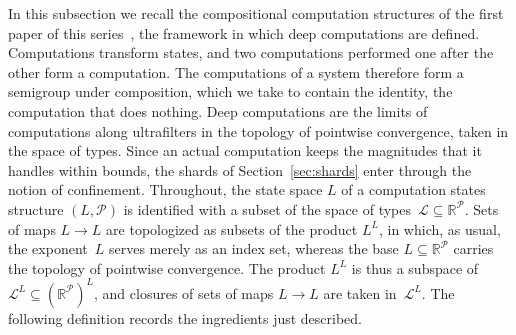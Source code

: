 \documentclass[psamsfonts]{amsart}
\theoremstyle{definition}
\theoremstyle{remark}
\numberwithin{equation}{section}
\begin{document}
In this subsection we recall the compositional computation structures of the first paper of this series~\cite{alva2024approximability}, the framework in which deep computations are defined.
Computations transform states, and two computations performed one after the other form a computation.
The computations of a system therefore form a semigroup under composition, which we take to contain the identity, the computation that does nothing.
Deep computations are the limits of computations along ultrafilters in the topology of pointwise convergence, taken in the space of types.
Since an actual computation keeps the magnitudes that it handles within bounds, the shards of Section~\ref{sec:shards} enter through the notion of confinement.
Throughout, the state space $L$ of a computation states structure $(L,\mathcal{P})$ is identified with a subset of the space of types~$\mathcal{L}\subseteq\mathbb{R}^{\mathcal{P}}$.
Sets of maps $L\to L$ are topologized as subsets of the product $L^L$, in which, as usual, the exponent~$L$ serves merely as an index set, whereas the base $L\subseteq\mathbb{R}^{\mathcal{P}}$ carries the topology of pointwise convergence.
The product $L^L$ is thus a subspace of~$\mathcal{L}^L\subseteq(\mathbb{R}^{\mathcal{P}})^L$, and closures of sets of maps $L\to L$ are taken in~$\mathcal{L}^L$.
The following definition records the ingredients just described.
\end{document}
